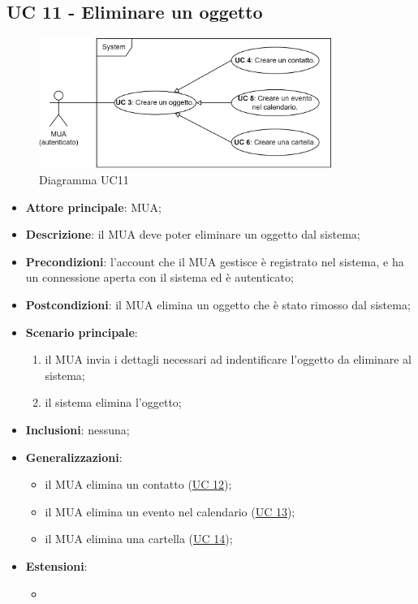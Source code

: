 \subsection{UC 11 - Eliminare un oggetto} \label{sec:UC3}
    \begin{figure}[h]
        \includegraphics[width=0.85\textwidth]{sections/uc_imgs/UC03.png}
        \centering
        \caption{Diagramma UC11 }
    \end{figure}
    \begin{itemize}
        \item \textbf{Attore principale}: MUA;
        \item \textbf{Descrizione}: il MUA deve poter eliminare un oggetto dal sistema;
        \item \textbf{Precondizioni}: l’account che il MUA gestisce è registrato nel sistema, e ha un connessione aperta con il sistema ed è autenticato;
        \item \textbf{Postcondizioni}: il MUA elimina un oggetto che è stato rimosso dal sistema;
        \item \textbf{Scenario principale}:
            \begin{enumerate}
                \item il MUA invia i dettagli necessari ad indentificare l'oggetto da eliminare al sistema;
                \item il sistema elimina l'oggetto;
            \end{enumerate}
        \item \textbf{Inclusioni}: nessuna;
        \item \textbf{Generalizzazioni}:
            \begin{itemize}
                \item il MUA elimina un contatto (\hyperref[sec:UC12]{UC 12});
                \item il MUA elimina un evento nel calendario (\hyperref[sec:UC13]{UC 13});
                \item il MUA elimina una cartella (\hyperref[sec:UC14]{UC 14});
            \end{itemize}
        \item \textbf{Estensioni}: 
        \begin{itemize}
            \item 
        \end{itemize}
    \end{itemize}

